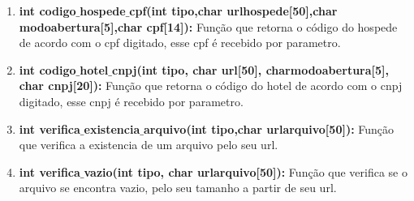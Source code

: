 \documentclass{article}
\begin{document}
\begin{enumerate}
		\item \textbf{int codigo$\_$hospede$\_$cpf(int tipo,char urlhospede[50],char modoabertura[5],char cpf[14]): }Função que retorna o código do hospede de acordo com o cpf digitado, esse cpf é recebido por parametro.\\
		\item \textbf{int codigo$\_$hotel$\_$cnpj(int tipo, char url[50], charmodoabertura[5], char cnpj[20]): }Função que retorna o código do hotel de acordo com o cnpj digitado, esse cnpj é recebido por parametro.\
		\item \textbf{int verifica$\_$existencia$\_$arquivo(int tipo,char urlarquivo[50]): }Função que verifica a existencia de um arquivo pelo seu url.\\
		\item \textbf{int verifica$\_$vazio(int tipo, char urlarquivo[50]): }Função que verifica se o arquivo se encontra vazio, pelo seu tamanho a partir de seu url.\\
\end{enumerate}
\end{document}
